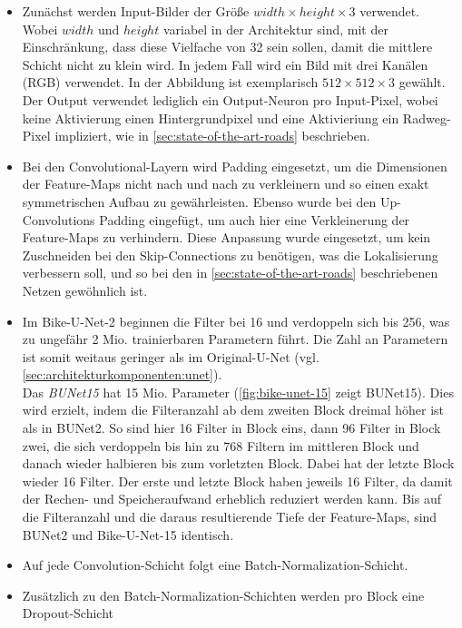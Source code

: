\begin{itemize}
	\item Zunächst werden Input-Bilder der Größe $width \times height \times 3$ verwendet. 
	Wobei $width$ und $height$ variabel in der Architektur sind, mit der Einschränkung, 
	dass diese Vielfache von 32 sein sollen, damit die mittlere Schicht nicht zu klein wird. 
	In jedem Fall wird ein Bild mit drei Kanälen (RGB) verwendet. 
	In der Abbildung ist exemplarisch $512 \times 512 \times 3$ gewählt. \\
	Der Output verwendet lediglich ein Output-Neuron pro Input-Pixel, wobei keine Aktivierung einen Hintergrundpixel 
	und eine Aktivieriung ein Radweg-Pixel impliziert, wie in \autoref{sec:state-of-the-art-roads} beschrieben. 
	\item Bei den Convolutional-Layern wird Padding eingesetzt,
	um die Dimensionen der Feature-Maps nicht nach und nach zu verkleinern und so einen exakt symmetrischen Aufbau zu gewährleisten.
	Ebenso wurde bei den Up-Convolutions Padding eingefügt, um auch hier eine Verkleinerung der Feature-Maps zu verhindern.
	Diese Anpassung wurde eingesetzt, um kein Zuschneiden bei den Skip-Connections zu benötigen, was die Lokalisierung verbessern soll,
	und so bei den in \autoref{sec:state-of-the-art-roads} beschriebenen Netzen gewöhnlich ist.
	\item 
	Im Bike-U-Net-2 beginnen die Filter bei 16 und verdoppeln sich bis 256, was zu ungefähr 2 Mio. 
	trainierbaren Parametern führt. Die Zahl an Parametern ist somit weitaus geringer als im 
	Original-U-Net (vgl. \autoref{sec:architekturkomponenten:unet}). \\
    Das \textit{\acf{BUNet15}} hat 15 Mio. Parameter (\autoref{fig:bike-unet-15} zeigt \ac{BUNet15}). Dies wird erzielt, 
	indem die Filteranzahl ab dem zweiten Block dreimal höher ist als in \ac{BUNet2}. So sind hier 16 Filter in Block eins, 
	dann 96 Filter in Block zwei, die sich verdoppeln bis hin zu 768 Filtern im mittleren Block und danach wieder halbieren bis zum vorletzten Block. 
	Dabei hat der letzte Block wieder 16 Filter. 
	Der erste und letzte Block haben jeweils 16 Filter, da damit der Rechen- und Speicheraufwand erheblich reduziert werden kann.
	Bis auf die Filteranzahl und die daraus resultierende Tiefe der Feature-Maps, sind \ac{BUNet2} und Bike-U-Net-15 identisch.
	\item Auf jede Convolution-Schicht folgt eine Batch-Normalization-Schicht. 
	\item Zusätzlich zu den Batch-Normalization-Schichten werden pro Block eine Dropout-Schicht 

\end{itemize}
